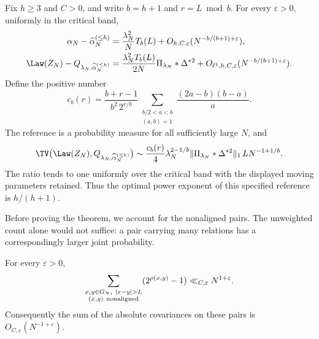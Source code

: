 \begin{theorem}
\label{p13:channels:hierarchy}
Fix $h\geq3$ and $C>0$, and write $b=h+1$ and $r=L\bmod b$.
For every $\varepsilon>0$, uniformly in the critical band,
\begin{align}
 \alpha_N-\widehat\alpha_N^{(\leq h)}
  &=\frac{\lambda_N^2}{N}T_b(L)
       +O_{h,C,\varepsilon}(N^{-b/(b+1)+\varepsilon}),
       \label{p13:channels:cumulant-remainder}\\
 \Law(Z_N)-Q_{\lambda_N,\widehat\alpha_N^{(\leq h)}}
  &=\frac{\lambda_N^2T_b(L)}{2N}\Pi_{\lambda_N}*\Delta^{*2}
       +O_{\ell^1,h,C,\varepsilon}(N^{-b/(b+1)+\varepsilon}).
       \label{p13:channels:law-remainder}
\end{align}
Define the positive number
\begin{equation}
 c_b(r)=\frac{b+r-1}{b^2\,2^{r/b}}
       \sum_{\substack{b/2<a<b\\(a,b)=1}}
                    \frac{(2a-b)(b-a)}a .
 \label{p13:channels:phase-constant}
\end{equation}
The reference is a probability measure for all sufficiently large $N$, and
\begin{equation}
 \TV\bigl(\Law(Z_N),Q_{\lambda_N,\widehat\alpha_N^{(\leq h)}}\bigr)
 \sim \frac{c_b(r)}4\lambda_N^{2-1/b}
       \|\Pi_{\lambda_N}*\Delta^{*2}\|_1\,
       L N^{-1+1/b}.
 \label{p13:channels:tv-equivalent}
\end{equation}
The ratio tends to one uniformly over the critical band with the displayed
moving parameters retained.  Thus the optimal power exponent of this
specified reference is $h/(h+1)$.
\end{theorem}

Before proving the theorem, we account for the nonaligned pairs.  The
unweighted count alone would not suffice: a pair carrying many relations
has a correspondingly larger joint probability.

\begin{lemma}
\label{p13:channels:weighted-nonaligned}
For every $\varepsilon>0$,
\begin{equation}
 \sum_{\substack{x,y\in G_N,\ |x-y|>L\\(x,y)\ {\rm nonaligned}}}
             (2^{\rho(x,y)}-1)
       \ll_{C,\varepsilon}N^{1+\varepsilon}.
 \label{p13:channels:nonaligned-weight}
\end{equation}
Consequently the sum of the absolute covariances on these pairs is
$O_{C,\varepsilon}(N^{-1+\varepsilon})$.
\end{lemma}

